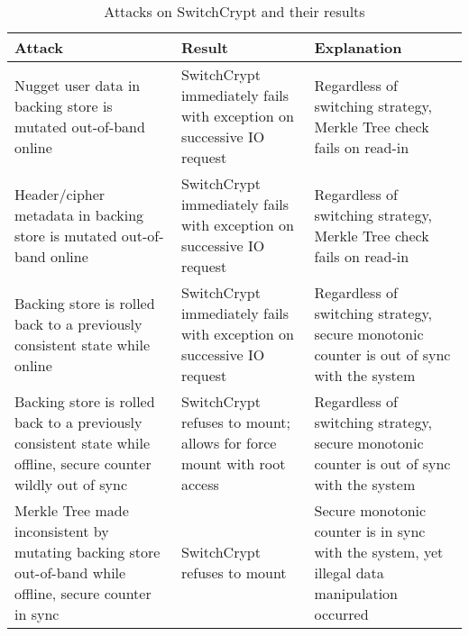 \begin{table}[t]
  \caption{Attacks on SwitchCrypt and their results}\label{tbl:security}
  \footnotesize
  \centering
  \begin{tabu} to \linewidth { | X[l] | X[c] | X[c] | }
    \hline
    \textbf{Attack} & \textbf{Result} & \textbf{Explanation} \\
    \hline\hline
    Nugget user data in backing store is mutated out-of-band online &
    SwitchCrypt immediately fails with exception on successive IO request &
    Regardless of switching strategy, Merkle Tree check fails on read-in\\
    \hline
    Header/cipher metadata in backing store is mutated out-of-band online &
    SwitchCrypt immediately fails with exception on successive IO request &
    Regardless of switching strategy, Merkle Tree check fails on read-in\\
    \hline
    Backing store is rolled back to a previously consistent state while online &
    SwitchCrypt immediately fails with exception on successive IO request &
    Regardless of switching strategy, secure monotonic counter is out of sync
    with the system\\
    \hline
    Backing store is rolled back to a previously consistent state while offline,
    secure counter wildly out of sync & SwitchCrypt refuses to mount; allows for
    force mount with root access & Regardless of switching strategy, secure
    monotonic counter is out of sync with the system\\
    \hline
    Merkle Tree made inconsistent by mutating backing store out-of-band while
    offline, secure counter in sync & SwitchCrypt refuses to mount & Secure
    monotonic counter is in sync with the system, yet illegal data manipulation
    occurred\\
    \hline\hline
  \end{tabu}
\end{table}

